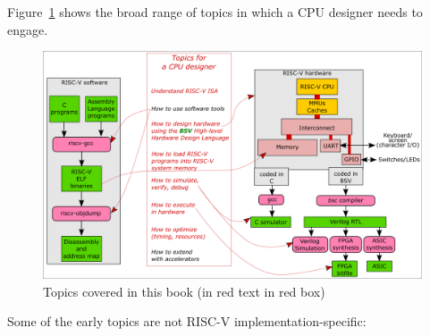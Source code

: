 Figure~\ref{Fig_Topics} shows the broad range of topics in which a CPU
designer needs to engage.
\begin{figure}[htbp]
  \centerline{\includegraphics[width=6in,angle=0]{Figures/Fig_Topics}}
  \caption{\label{Fig_Topics}Topics covered in this book (in red text in red box)}
\end{figure}
Some of the early topics are not RISC-V implementation-specific:

